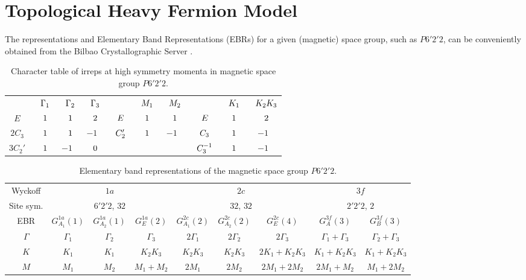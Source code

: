 \documentclass[12pt]{report}
\begin{document}
\section{Topological Heavy Fermion Model} \label{sec:topo_heavy_fermion}

The representations and Elementary Band Representations (EBRs) for a given (magnetic) space group, such as \( P6'2'2 \), can be conveniently obtained from the Bilbao Crystallographic Server \cite{bilbao_1, bilbao_2}.

\begin{table}[H]
\caption{Character table of irreps at high symmetry momenta in magnetic space group $P6'2'2$.}
\centering
\begin{tabular} { c c c c | c c c | c c c }
\cline{1-10}
$\P$ & $\P \Gamma_1$ & $\P \Gamma_2$ & $\P \Gamma_3$ & $\P$ & $\P M_1$ & $\P M_2$ & $\P$ & $\P K_1$ & $\P K_2K_3$ \\
\cline{1-10}
$E$ & $\P1$ & $\P1$ & $\P2$ & $\P E$ & $\P1$ & $\P1$ & $\P E$ & $\P1$ & $\P2$ \\
$2 C_3$ & $\P1$ & $\P1$ & $ -1$ & $\P C_2'$ & $\P1$ & $ -1$ & $\P C_3$ & $\P1$ & $ -1$ \\
$3 C_2'$ & $\P1$ & $ -1$ & $\P0$ & $\P$ & $\P$ & $\P$ & $\P C_3^{-1}$ & $\P1$ & $-1$ \\
\cline{1-10}
\end{tabular}
\label{tab:P6'2'2}
\end{table}

\begin{table}[H]
\footnotesize
\caption{Elementary band representations of the magnetic space group $P6'2'2$.}
\centering
\begin{tabular}{|c|c|c|c|c|c|c|c|c|}
\hline
Wyckoff & \multicolumn{3}{c|}{$1a$} & \multicolumn{3}{c|}{$2c$} & \multicolumn{2}{c|}{$3f$} \\
\cline{1-9}
Site sym. & \multicolumn{3}{c|}{$6'2'2$, $32$} & \multicolumn{3}{c|}{$32$, $32$} & \multicolumn{2}{c|}{$2'2'2$, $2$} \\
\cline{1-9}
EBR & $G_{A_1}^{1a}(1)$ & $G_{A_2}^{1a}(1)$ & $G_{E}^{1a}(2)$ & $G_{A_1}^{2c}(2)$ & $G_{A_2}^{2c}(2)$ & $G_{E}^{2c}(4)$   & $G_{A}^{3f}(3)$ & $G_{B}^{3f}(3)$ \\
\hline
$\Gamma$ & $\Gamma_1$ & $\Gamma_2$ & $\Gamma_3$ & $2\Gamma_1$ & $2\Gamma_2$ & $2\Gamma_3$ & $\Gamma_1+\Gamma_3$ & $\Gamma_2+\Gamma_3$ \\
\hline
$K$ & $K_1$ & $K_1$ & $K_2 K_3$ & $K_2 K_3$ & $K_2 K_3$ & $2K_1 + K_2 K_3$ & $K_1+K_2 K_3$ & $K_1+K_2 K_3$ \\
\hline
$M$ & $M_1$ & $M_2$ & $M_1+M_2$ & $2M_1$ & $2M_2$ & $2M_1+2M_2$ & $2M_1+M_2$ & $M_1+2M_2$ \\
\hline
\end{tabular}
\label{tab:matbg-irreps}
\end{table}
\end{document}
